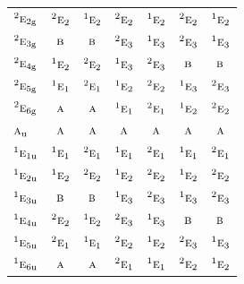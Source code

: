 \documentclass[10pt,a4paper]{article}
\numberwithin{equation}{section}
\newcommand{\irr}[1]{\text{\normalfont\scshape #1}}
\newcommand{\conjpair}[1]{{}^{#1}}
\newcommand{\ptag}[1]{\mathrm{#1}}
\begin{document}
{\begin{longtable}{@{}lcccccc@{}}
$\conjpair{2}\irr{e}_{2\ptag{g}}$ & $\conjpair{2}\irr{e}_{2}$ & $\conjpair{1}\irr{e}_{2}$ & $\conjpair{2}\irr{e}_{2}$ & $\conjpair{1}\irr{e}_{2}$ & $\conjpair{2}\irr{e}_{2}$ & $\conjpair{1}\irr{e}_{2}$\\
$\conjpair{2}\irr{e}_{3\ptag{g}}$ & $\irr{b}$ & $\irr{b}$ & $\conjpair{2}\irr{e}_{3}$ & $\conjpair{1}\irr{e}_{3}$ & $\conjpair{2}\irr{e}_{3}$ & $\conjpair{1}\irr{e}_{3}$\\
$\conjpair{2}\irr{e}_{4\ptag{g}}$ & $\conjpair{1}\irr{e}_{2}$ & $\conjpair{2}\irr{e}_{2}$ & $\conjpair{1}\irr{e}_{3}$ & $\conjpair{2}\irr{e}_{3}$ & $\irr{b}$ & $\irr{b}$\\
$\conjpair{2}\irr{e}_{5\ptag{g}}$ & $\conjpair{1}\irr{e}_{1}$ & $\conjpair{2}\irr{e}_{1}$ & $\conjpair{1}\irr{e}_{2}$ & $\conjpair{2}\irr{e}_{2}$ & $\conjpair{1}\irr{e}_{3}$ & $\conjpair{2}\irr{e}_{3}$\\
$\conjpair{2}\irr{e}_{6\ptag{g}}$ & $\irr{a}$ & $\irr{a}$ & $\conjpair{1}\irr{e}_{1}$ & $\conjpair{2}\irr{e}_{1}$ & $\conjpair{1}\irr{e}_{2}$ & $\conjpair{2}\irr{e}_{2}$\\
$\irr{a}_{\ptag{u}}$ & $\irr{a}$ & $\irr{a}$ & $\irr{a}$ & $\irr{a}$ & $\irr{a}$ & $\irr{a}$\\
$\conjpair{1}\irr{e}_{1\ptag{u}}$ & $\conjpair{1}\irr{e}_{1}$ & $\conjpair{2}\irr{e}_{1}$ & $\conjpair{1}\irr{e}_{1}$ & $\conjpair{2}\irr{e}_{1}$ & $\conjpair{1}\irr{e}_{1}$ & $\conjpair{2}\irr{e}_{1}$\\
$\conjpair{1}\irr{e}_{2\ptag{u}}$ & $\conjpair{1}\irr{e}_{2}$ & $\conjpair{2}\irr{e}_{2}$ & $\conjpair{1}\irr{e}_{2}$ & $\conjpair{2}\irr{e}_{2}$ & $\conjpair{1}\irr{e}_{2}$ & $\conjpair{2}\irr{e}_{2}$\\
$\conjpair{1}\irr{e}_{3\ptag{u}}$ & $\irr{b}$ & $\irr{b}$ & $\conjpair{1}\irr{e}_{3}$ & $\conjpair{2}\irr{e}_{3}$ & $\conjpair{1}\irr{e}_{3}$ & $\conjpair{2}\irr{e}_{3}$\\
$\conjpair{1}\irr{e}_{4\ptag{u}}$ & $\conjpair{2}\irr{e}_{2}$ & $\conjpair{1}\irr{e}_{2}$ & $\conjpair{2}\irr{e}_{3}$ & $\conjpair{1}\irr{e}_{3}$ & $\irr{b}$ & $\irr{b}$\\
$\conjpair{1}\irr{e}_{5\ptag{u}}$ & $\conjpair{2}\irr{e}_{1}$ & $\conjpair{1}\irr{e}_{1}$ & $\conjpair{2}\irr{e}_{2}$ & $\conjpair{1}\irr{e}_{2}$ & $\conjpair{2}\irr{e}_{3}$ & $\conjpair{1}\irr{e}_{3}$\\
$\conjpair{1}\irr{e}_{6\ptag{u}}$ & $\irr{a}$ & $\irr{a}$ & $\conjpair{2}\irr{e}_{1}$ & $\conjpair{1}\irr{e}_{1}$ & $\conjpair{2}\irr{e}_{2}$ & $\conjpair{1}\irr{e}_{2}$\\

\end{longtable}}
\end{document}
